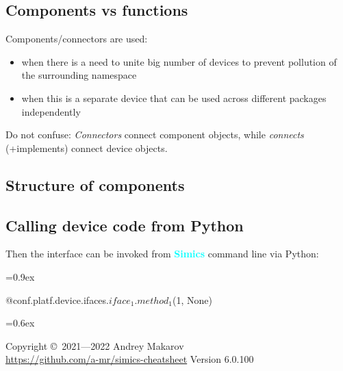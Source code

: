 \documentclass[8pt]{extarticle}
\newenvironment{code}[1][]{%
\begin{prebox}[#1]\obeylines%
\fontdimen2\font=0.9ex%
}{%
\end{prebox}%
\fontdimen2\font=0.6ex%
}
\newcommand{\Simics}{\textcolor{cyan}{\textbf{Simics}}}
\begin{document}
\begin{multicols*}{3}
\subsection{Components vs functions}

Components/connectors are used:
\begin{itemize}
    \item when there is a need to unite big number of devices
        to prevent pollution of the surrounding namespace
    \item when this is a separate device that can be used across
        different packages independently
\end{itemize}

{\LARGE \warning} Do not confuse: \textit{Connectors} connect component 
objects, while \textit{connects} (+implements) connect device objects.

\subsection{Structure of components}

\subsection{Calling device code from Python}

Then the interface can be invoked from \Simics{} command line via Python:
\begin{code}
    @conf.platf.device.ifaces.$iface_1$.$method_1$(1, None)
\end{code}

Copyright \copyright\ 2021—2022 Andrey Makarov \\
\href{https://github.com/a-mr/simics-cheatsheet}{https://github.com/a-mr/simics-cheatsheet}
Version 6.0.100

\ifdefined\cheatsheetCompact
\end{multicols*}
\fi
\end{document}
